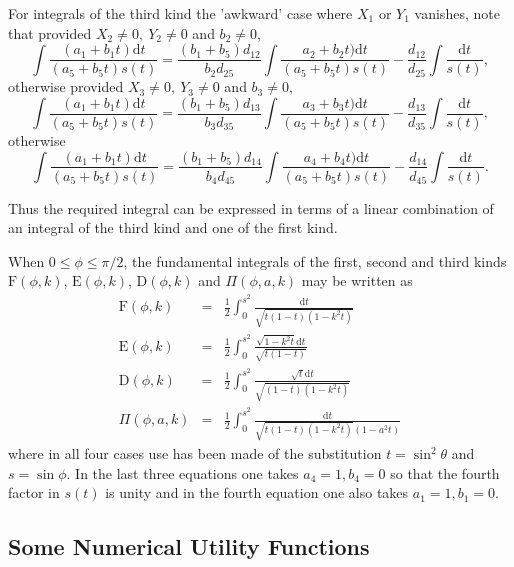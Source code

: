 For integrals of the third kind the 'awkward' case where $X_1$ or $Y_1$ vanishes,
note that provided $X_2 \neq 0,\ Y_2 \neq 0$ and $b_2 \neq 0$,
\[ \int \frac{(a_1+b_1t)\mathrm{d}t} {(a_5+b_5t)s(t)} =
\frac{(b_1+b_5)d_{12}}{b_2d_{25}}\int\frac{a_2+b_2t)\mathrm{d}t} {(a_5+b_5t)s(t)}
 -\frac{d_{12}}{d_{25}}\int \frac{\mathrm{d}t} {s(t)},\]
otherwise  provided $X_3 \neq 0,\ Y_3 \neq 0$ and $b_3 \neq 0$,
\[ \int \frac{(a_1+b_1t)\mathrm{d}t} {(a_5+b_5t)s(t)} =
\frac{(b_1+b_5)d_{13}}{b_3d_{35}}\int\frac{a_3+b_3t)\mathrm{d}t} {(a_5+b_5t)s(t)}
- \frac{d_{13}}{d_{35}}\int \frac{\mathrm{d}t} {s(t)},\]
otherwise
\[ \int \frac{(a_1+b_1t)\mathrm{d}t} {(a_5+b_5t)s(t)} =
\frac{(b_1+b_5)d_{14}}{b_4d_{45}}\int\frac{a_4+b_4t)\mathrm{d}t} {(a_5+b_5t)s(t)}
-\frac{d_{14}}{d_{45}}\int \frac{\mathrm{d}t} {s(t)}.\]

Thus the required integral can be expressed in terms of a linear combination of
an integral of the third kind and one of the first kind.


When $0 \leq \phi \leq \pi/2$, the fundamental integrals of the first, second
and third kinds $\mathrm{F}(\phi,k)$, $\mathrm{E}(\phi,k)$, $\mathrm{D}(\phi,k)$
and $\Pi(\phi,a,k)$ may be written as
\begin{eqnarray*}
\mathrm{F}(\phi,k) &=& \frac{1}{2}\int_0^{s^2} \frac{\mathrm{d}t}{\sqrt{t(1-t)(1-k^2t)}}\\
\mathrm{E}(\phi,k) &=& \frac{1}{2}\int_0^{s^2} \frac{\sqrt{1-k^2t}\mathrm{d}t}{\sqrt{t(1-t)}}\\
\mathrm{D}(\phi,k) &=& \frac{1}{2}\int_0^{s^2} \frac{\sqrt{t}\mathrm{d}t}{\sqrt{(1-t)(1-k^2t)}}\\
\Pi(\phi,a,k) &=& \frac{1}{2}\int_0^{s^2} \frac{\mathrm{d}t}{\sqrt{t(1-t)(1-k^2t)}(1-a^2t)}
\end{eqnarray*}
where in all four cases use has been made of the substitution $t=\sin^2 \theta$
and $s=\sin\phi$. In the last three equations one takes $a_4=1, b_4 =0$ so that
the fourth factor in $s(t)$ is unity and in the fourth equation one also takes
$a_1=1,b_1=0$.

\subsection{Some Numerical Utility Functions}
\hypertarget{operator:NOME}{}
\hypertarget{operator:NOME2K}{}
\hypertarget{operator:NOME2K'}{}
\hypertarget{operator:NOME2MOD}{}
\hypertarget{operator:NOME2MOD'}{}
\hypertarget{ELLIPNOME}{}

